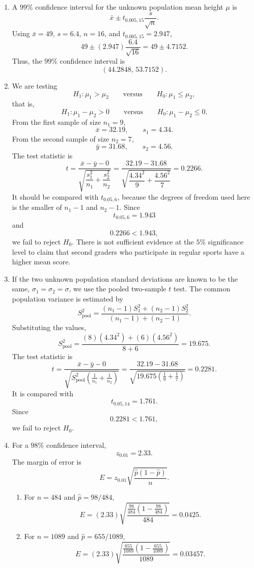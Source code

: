 \documentclass[11pt]{article}
\begin{document}
\begin{enumerate}[label=\textbf{(\arabic*)}, start=9, leftmargin=*]
\item A $99\%$ confidence interval for the unknown population mean height $\mu$ is
\[
\bar{x}\pm t_{0.005,15}\frac{s}{\sqrt{n}}.
\]
Using $\bar{x}=49$, $s=6.4$, $n=16$, and $t_{0.005,15}=2.947$,
\[
49\pm (2.947)\frac{6.4}{\sqrt{16}}
=49\pm 4.7152.
\]
Thus, the $99\%$ confidence interval is
\[
(44.2848,\,53.7152).
\]

\item We are testing
\[
H_1:\mu_1>\mu_2
\qquad \text{versus} \qquad
H_0:\mu_1\le \mu_2,
\]
that is,
\[
H_1:\mu_1-\mu_2>0
\qquad \text{versus} \qquad
H_0:\mu_1-\mu_2\le 0.
\]
From the first sample of size $n_1=9$,
\[
\bar{x}=32.19, \qquad s_1=4.34.
\]
From the second sample of size $n_2=7$,
\[
\bar{y}=31.68, \qquad s_2=4.56.
\]
The test statistic is
\[
t=\frac{\bar{x}-\bar{y}-0}{\sqrt{\dfrac{s_1^2}{n_1}+\dfrac{s_2^2}{n_2}}}
=\frac{32.19-31.68}{\sqrt{\dfrac{4.34^2}{9}+\dfrac{4.56^2}{7}}}
=0.2266.
\]
It should be compared with $t_{0.05,6}$, because the degrees of freedom used here is the smaller of $n_1-1$ and $n_2-1$. Since
\[
t_{0.05,6}=1.943
\]
and
\[
0.2266<1.943,
\]
we fail to reject $H_0$. There is not sufficient evidence at the $5\%$ significance level to claim that second graders who participate in regular sports have a higher mean score.

\item If the two unknown population standard deviations are known to be the same, $\sigma_1=\sigma_2=\sigma$, we use the pooled two-sample $t$ test. The common population variance is estimated by
\[
S_{\mathrm{pool}}^2
=\frac{(n_1-1)S_1^2+(n_2-1)S_2^2}{(n_1-1)+(n_2-1)}.
\]
Substituting the values,
\[
S_{\mathrm{pool}}^2
=\frac{(8)(4.34^2)+(6)(4.56^2)}{8+6}
=19.675.
\]
The test statistic is
\[
t=\frac{\bar{x}-\bar{y}-0}{\sqrt{S_{\mathrm{pool}}^2\left(\frac{1}{n_1}+\frac{1}{n_2}\right)}}
=\frac{32.19-31.68}{\sqrt{19.675\left(\frac{1}{9}+\frac{1}{7}\right)}}
=0.2281.
\]
It is compared with
\[
t_{0.05,14}=1.761.
\]
Since
\[
0.2281<1.761,
\]
we fail to reject $H_0$.

\item For a $98\%$ confidence interval,
\[
z_{0.01}=2.33.
\]
The margin of error is
\[
E=z_{0.01}\sqrt{\frac{\widehat{p}(1-\widehat{p})}{n}}.
\]

\begin{enumerate}[label=(\alph*)]
\item For $n=484$ and $\widehat{p}=98/484$,
\[
E=(2.33)\sqrt{\frac{\frac{98}{484}\left(1-\frac{98}{484}\right)}{484}}
=0.0425.
\]

\item For $n=1089$ and $\widehat{p}=655/1089$,
\[
E=(2.33)\sqrt{\frac{\frac{655}{1089}\left(1-\frac{655}{1089}\right)}{1089}}
=0.03457.
\]


\end{enumerate}
\end{enumerate}
\end{document}
